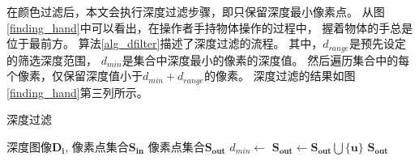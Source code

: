 在颜色过滤后，本文会执行深度过滤步骤，即只保留深度最小像素点。
从图\ref{finding_hand}中可以看出，在操作者手持物体操作的过程中，
握着物体的手总是位于最前方。
算法\ref{alg_dfilter}描述了深度过滤的流程。
其中，$d_{range}$是预先设定的筛选深度范围，%
$d_{min}$是集合中深度最小的像素的深度值。
然后遍历集合中的每个像素，仅保留深度值小于$d_{min}+d_{range}$的像素。
深度过滤的结果如图\ref{finding_hand}第三列所示。
\begin{algorithm}
    \fangsong
    \caption{深度过滤}
    \label{alg_dfilter}
    \begin{algorithmic}[1]
        \Require 深度图像$\mathbf{D_i}$, 像素点集合$\mathbf{S_{in}}$
        \Ensure 像素点集合$\mathbf{S_{out}}$
            \State $d_{min} \gets$ 
                    \State $\mathbf{S_{out}} \gets \mathbf{S_{out}} \bigcup \{\mathbf{u}\}$
                \EndIf
            \EndFor
            \State \Return $\mathbf{S_{out}}$
        \EndFunction
    \end{algorithmic}
\end{algorithm}
